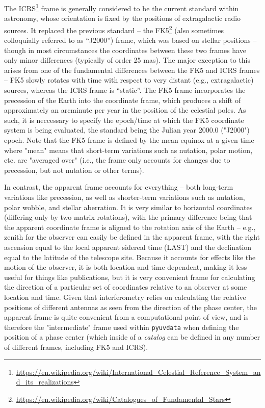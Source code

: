 \documentclass[11pt, oneside]{article}
\begin{document}
The ICRS\footnote{\url{https://en.wikipedia.org/wiki/International_Celestial_Reference_System_and_its_realizations}} frame is generally considered to be the current standard within astronomy, whose orientation is fixed by the positions of extragalactic radio sources. It replaced the previous standard -- the FK5\footnote{\url{https://en.wikipedia.org/wiki/Catalogues_of_Fundamental_Stars}} (also sometimes colloquially referred to as ``J2000'') frame, which was based on stellar positions -- though in most circumstances the coordinates between these two frames have only minor differences (typically of order 25 mas). The major exception to this arises from one of the fundamental differences between the FK5 and ICRS frames -- FK5 slowly rotates with time with respect to very distant (e.g., extragalactic) sources, whereas the ICRS frame is ``static''. The FK5 frame incorporates the precession of the Earth into the coordinate frame, which produces a shift of approximately an arcminute per year in the position of the celestial poles. As such, it is neccessary to specify the epoch/time at which the FK5 coordinate system is being evaluated, the standard being the Julian year 2000.0 ("J2000") epoch. Note that the FK5 frame is defined by the mean equinox at a given time -- where "mean" means that short-term variations such as nutation, polar motion, etc. are "averaged over" (i.e., the frame only accounts for changes due to precession, but not nutation or other terms).

In contrast, the apparent frame accounts for everything -- both long-term variations like precession, as well as shorter-term variations such as nutation, polar wobble, and stellar aberration. It is very similar to horizontal coordinates (differing only by two matrix rotations), with the primary difference being that the apparent coordinate frame is aligned to the rotation axis of the Earth  -- e.g., zenith for the observer can easily be defined in the apparent frame, with the right ascension equal to the local apparent sidereal time (LAST) and the declination equal to the latitude of the telescope site. Because it accounts for effects like the motion of the observer, it is both location and time dependent, making it less useful for things like publications, but it is very convenient frame for calculating the direction of a particular set of coordinates relative to an observer at some location and time. Given that interferometry relies on calculating the relative positions of different antennas as seen from the direction of the phase center, the apparent frame is quite convenient from a computational point of view, and is therefore the "intermediate" frame used within \texttt{pyuvdata} when defining the position of a phase center (which inside of a \emph{catalog} can be defined in any number of different frames, including FK5 and ICRS).
\end{document}
